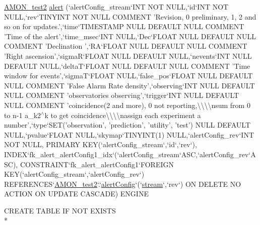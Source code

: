 \begin{DoxyCompactItemize}
\hyperlink{db__mc__build_8sql_a19c21c59303d8b6591b92240ff7de1d5}{A\-M\-O\-N\-\_\-test2} \hyperlink{db__mc__build_8sql_a38a604686c7d372f50752e893e3e1e21}{alert} (`alert\-Config\-\_\-stream`I\-N\-T N\-O\-T N\-U\-L\-L,`id`I\-N\-T N\-O\-T N\-U\-L\-L,`rev`T\-I\-N\-Y\-I\-N\-T N\-O\-T N\-U\-L\-L C\-O\-M\-M\-E\-N\-T 'Revision, 0 preliminary, 1, 2 and so on for updates.',`time`T\-I\-M\-E\-S\-T\-A\-M\-P N\-U\-L\-L D\-E\-F\-A\-U\-L\-T N\-U\-L\-L C\-O\-M\-M\-E\-N\-T 'Time of the alert',`time\-\_\-msec`I\-N\-T N\-U\-L\-L,`Dec`F\-L\-O\-A\-T N\-U\-L\-L D\-E\-F\-A\-U\-L\-T N\-U\-L\-L C\-O\-M\-M\-E\-N\-T 'Declination ',`R\-A`F\-L\-O\-A\-T N\-U\-L\-L D\-E\-F\-A\-U\-L\-T N\-U\-L\-L C\-O\-M\-M\-E\-N\-T 'Right ascension',`sigma\-R`F\-L\-O\-A\-T N\-U\-L\-L D\-E\-F\-A\-U\-L\-T N\-U\-L\-L,`nevents`I\-N\-T N\-U\-L\-L D\-E\-F\-A\-U\-L\-T N\-U\-L\-L,`delta\-T`F\-L\-O\-A\-T N\-U\-L\-L D\-E\-F\-A\-U\-L\-T N\-U\-L\-L C\-O\-M\-M\-E\-N\-T 'Time window for events',`sigma\-T`F\-L\-O\-A\-T N\-U\-L\-L,`false\-\_\-pos`F\-L\-O\-A\-T N\-U\-L\-L D\-E\-F\-A\-U\-L\-T N\-U\-L\-L C\-O\-M\-M\-E\-N\-T 'False Alarm Rate density',`observing`I\-N\-T N\-U\-L\-L D\-E\-F\-A\-U\-L\-T N\-U\-L\-L C\-O\-M\-M\-E\-N\-T 'observatories observing',`trigger`I\-N\-T N\-U\-L\-L D\-E\-F\-A\-U\-L\-T N\-U\-L\-L C\-O\-M\-M\-E\-N\-T 'coincidence(2 and more), 0 not reporting,\textbackslash{}\textbackslash{}\textbackslash{}\textbackslash{}nsum from 0 to n-\/1 a\-\_\-k2$^\wedge$k to get coincidence\textbackslash{}\textbackslash{}\textbackslash{}\textbackslash{}nassign each experiment a number',`type`S\-E\-T('observation', 'prediction', 'utility', 'test') N\-U\-L\-L D\-E\-F\-A\-U\-L\-T N\-U\-L\-L,`pvalue`F\-L\-O\-A\-T N\-U\-L\-L,`skymap`T\-I\-N\-Y\-I\-N\-T(1) N\-U\-L\-L,`alert\-Config\-\_\-rev`I\-N\-T N\-O\-T N\-U\-L\-L, P\-R\-I\-M\-A\-R\-Y K\-E\-Y(`alert\-Config\-\_\-stream`,`id`,`rev`), I\-N\-D\-E\-X`fk\-\_\-alert\-\_\-alert\-Config1\-\_\-idx`(`alert\-Config\-\_\-stream`A\-S\-C,`alert\-Config\-\_\-rev`A\-S\-C), C\-O\-N\-S\-T\-R\-A\-I\-N\-T`fk\-\_\-alert\-\_\-alert\-Config1`F\-O\-R\-E\-I\-G\-N K\-E\-Y(`alert\-Config\-\_\-stream`,`alert\-Config\-\_\-rev`) R\-E\-F\-E\-R\-E\-N\-C\-E\-S`\hyperlink{db__mc__build_8sql_a19c21c59303d8b6591b92240ff7de1d5}{A\-M\-O\-N\-\_\-test2}`.`\hyperlink{db__mc__build_8sql_a59c95167d94d5f5b33fb03d5d96d7af9}{alert\-Config}`(`\hyperlink{db__mc__build_8sql_a67b7e9fc922cbf49b5ae3124240f4188}{stream}`,`rev`) O\-N D\-E\-L\-E\-T\-E N\-O A\-C\-T\-I\-O\-N O\-N U\-P\-D\-A\-T\-E C\-A\-S\-C\-A\-D\-E) E\-N\-G\-I\-N\-E
\item 
C\-R\-E\-A\-T\-E T\-A\-B\-L\-E I\-F N\-O\-T E\-X\-I\-S\-T\-S \\*

\end{DoxyCompactItemize}
